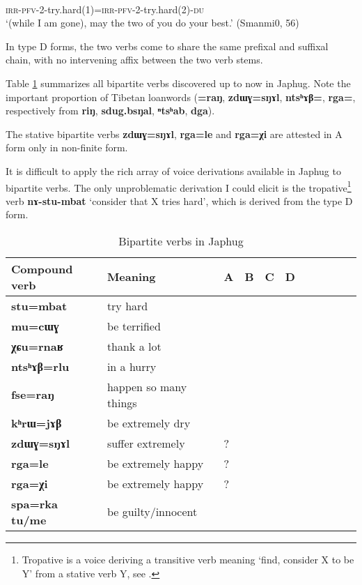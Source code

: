 \documentclass[oneside,a4paper,11pt]{article}
\newcommand{\ipa}[1]{{\phon\textbf{#1}}}
\newcommand{\Y}{\Checkmark}
\newcommand{\jpg}[2]{\ipa{#1} `#2'}
\begin{document}
\begin{exe}
\ex \label{ex:atAtWstu}
\gll \ipa{a-tɤ-tɯ-stu=a-tɤ-tɯ-mbat-ndʑi} \\
\textsc{irr-pfv-2}-try.hard(1)=\textsc{irr-pfv-2}-try.hard(2)-\textsc{du} \\
\glt `(while I am gone),  may the two of you do your best.' (Smanmi0, 56)
\end{exe}

In type D forms, the two verbs come to share the same prefixal and suffixal chain, with no intervening affix between the two verb stems.

Table \ref{tab:bipartite} summarizes all bipartite verbs discovered up to now in Japhug. Note the important proportion of Tibetan loanwords (\ipa{=raŋ}, \ipa{zdɯɣ=sŋɤl}, \ipa{ntsʰɤβ=}, \ipa{rga=}, respectively from \ipa{riŋ}, \ipa{sdug.bsŋal}, \ipa{ⁿtsʰab}, \ipa{dga}).

The stative bipartite verbs \ipa{zdɯɣ=sŋɤl}, \ipa{rga=le} and \ipa{rga=χi} are attested in A form only in non-finite form. 

It is difficult to apply the rich array of voice derivations available in Japhug to bipartite verbs. The only unproblematic derivation I could elicit is the tropative\footnote{Tropative is a voice deriving a transitive verb meaning `find, consider X to be Y' from a stative verb Y, see \citet{jacques13tropative}.} verb \jpg{nɤ-stu-mbat}{consider that X tries hard}, which is derived from the type D form.

\begin{table}[h]
\caption{Bipartite verbs in Japhug} \label{tab:bipartite} \centering
\begin{tabular}{lllllllllll}
\toprule
Compound verb& Meaning	 & 	A & 	B & 	C & 	D & \\
\midrule
\ipa{stu=mbat} & 	try hard & 	\Y & 	\Y & 	\Y & 	\Y & 	\\	
\ipa{mu=cɯɣ} & 	be  terrified  & 	\Y & 	 & 	 & 	 & 	\\	
\ipa{χɕu=rnaʁ} & 	thank a lot & 	\Y & 	\Y & 	 & 	 & 	\\	
\ipa{ntsʰɤβ=rlu} & 	in a hurry & 	 & 	\Y & 	 & 	\Y & 	\\	
\ipa{fse=raŋ} & 	happen so many things & 	\Y & 	 & 	 & 	 & 	\\	
\ipa{kʰrɯ=jɤβ} & 	be extremely dry & 	\Y & 	 & 	 & 	\Y & 	\\	
\ipa{zdɯɣ=sŋɤl} & 	suffer extremely & 	\Y? & 	 & 	 & 	\Y & 	\\	
\ipa{rga=le} & 	be extremely happy & 	\Y? & 	\Y & 	 & 	 & 	\\	
\ipa{rga=χi} & 	be extremely happy & 	\Y? & 	\Y & 	 & 	 & 	\\	
\midrule
\ipa{spa=rka tu/me} & 	be guilty/innocent & 	\Y & 	 & 	 & 	\Y & 	\\	
\bottomrule
\end{tabular}
\end{table}
\end{document}
